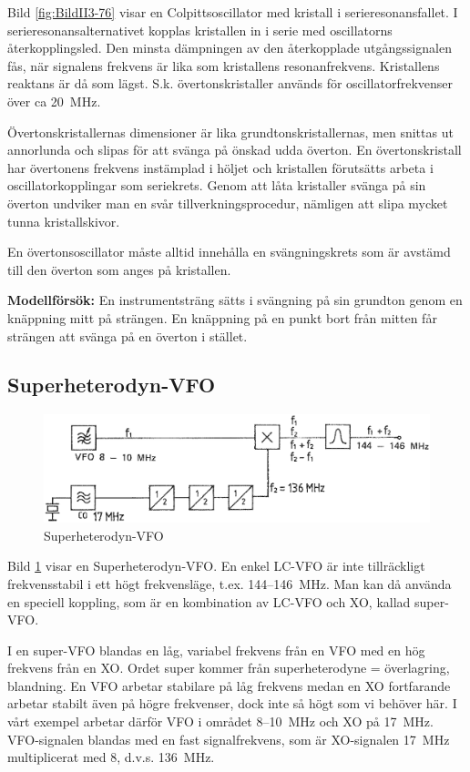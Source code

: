 Bild \ref{fig:BildII3-76} visar en Colpittsoscillator med kristall i
serieresonansfallet.
I serieresonansalternativet kopplas kristallen in i serie med
oscillatorns återkopplingsled.
Den minsta dämpningen av den återkopplade utgångssignalen fås, när signalens
frekvens är lika som kristallens resonanfrekvens.
Kristallens reaktans är då som lägst.
S.k. övertonskristaller används för oscillatorfrekvenser över ca 20~MHz.

Övertonskristallernas dimensioner är lika grundtonskristallernas, men
snittas ut annorlunda och slipas för att svänga på önskad udda överton.
En övertonskristall har övertonens frekvens instämplad i höljet och kristallen
förutsätts arbeta i oscillatorkopplingar som seriekrets.
Genom att låta kristaller svänga på sin överton undviker man en svår
tillverkningsprocedur, nämligen att slipa mycket tunna kristallskivor.

En övertonsoscillator måste alltid innehålla en svängningskrets som är
avstämd till den överton som anges på kristallen.

\textbf{Modellförsök:}
En instrumentsträng sätts i svängning på sin grundton genom en knäppning mitt
på strängen.
En knäppning på en punkt bort från mitten får strängen att svänga på en överton
i stället.

\subsection{Superheterodyn-VFO}

\begin{figure}
\includegraphics[width=\textwidth]{images/cropped_pdfs/bild_2_3-77.pdf}
\caption{Superheterodyn-VFO}
\label{fig:BildII3-77}
\end{figure}

Bild \ref{fig:BildII3-77} visar en Superheterodyn-VFO.
En enkel LC-VFO är inte tillräckligt frekvensstabil i ett högt frekvensläge,
t.ex. 144--146~MHz.
Man kan då använda en speciell koppling, som är en kombination av LC-VFO och
XO, kallad super-VFO.

I en super-VFO blandas en låg, variabel frekvens från en VFO med en hög
frekvens från en XO.
Ordet super kommer från superheterodyne = överlagring, blandning.
En VFO arbetar stabilare på låg frekvens medan en XO fortfarande arbetar
stabilt även på högre frekvenser, dock inte så högt som vi behöver här.
I vårt exempel arbetar därför VFO i området 8--10~MHz och XO på 17~MHz.
VFO-signalen blandas med en fast signalfrekvens, som är XO-signalen 17~MHz
multiplicerat med 8, d.v.s. 136~MHz.

